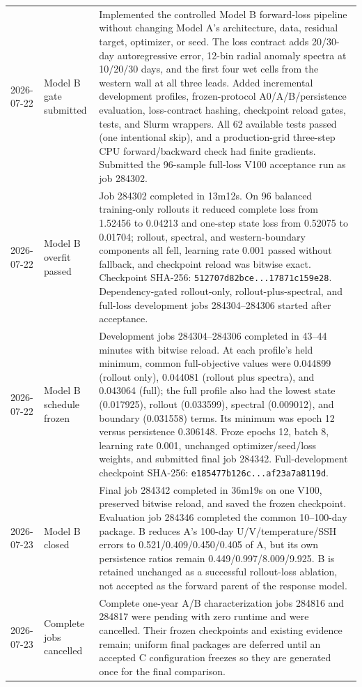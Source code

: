 \documentclass[11pt]{article}
\begin{document}
\begin{longtable}{@{}p{}p{}p{}@{}}
2026-07-22 & Model B gate submitted & Implemented the controlled Model B forward-loss pipeline without changing Model A's architecture, data, residual target, optimizer, or seed.  The loss contract adds 20/30-day autoregressive error, 12-bin radial anomaly spectra at 10/20/30 days, and the first four wet cells from the western wall at all three leads.  Added incremental development profiles, frozen-protocol A0/A/B/persistence evaluation, loss-contract hashing, checkpoint reload gates, tests, and Slurm wrappers.  All 62 available tests passed (one intentional skip), and a production-grid three-step CPU forward/backward check had finite gradients.  Submitted the 96-sample full-loss V100 acceptance run as job 284302. \\
2026-07-22 & Model B overfit passed & Job 284302 completed in 13m12s.  On 96 balanced training-only rollouts it reduced complete loss from 1.52456 to 0.04213 and one-step state loss from 0.52075 to 0.01704; rollout, spectral, and western-boundary components all fell, learning rate 0.001 passed without fallback, and checkpoint reload was bitwise exact.  Checkpoint SHA-256: \texttt{512707d82bce...17871c159e28}.  Dependency-gated rollout-only, rollout-plus-spectral, and full-loss development jobs 284304--284306 started after acceptance. \\
2026-07-22 & Model B schedule frozen & Development jobs 284304--284306 completed in 43--44 minutes with bitwise reload.  At each profile's held minimum, common full-objective values were 0.044899 (rollout only), 0.044081 (rollout plus spectra), and 0.043064 (full); the full profile also had the lowest state (0.017925), rollout (0.033599), spectral (0.009012), and boundary (0.031558) terms.  Its minimum was epoch 12 versus persistence 0.306148.  Froze epochs 12, batch 8, learning rate 0.001, unchanged optimizer/seed/loss weights, and submitted final job 284342.  Full-development checkpoint SHA-256: \texttt{e185477b126c...af23a7a8119d}. \\
2026-07-23 & Model B closed & Final job 284342 completed in 36m19s on one V100, preserved bitwise reload, and saved the frozen checkpoint.  Evaluation job 284346 completed the common 10--100-day package.  B reduces A's 100-day U/V/temperature/SSH errors to 0.521/0.409/0.450/0.405 of A, but its own persistence ratios remain 0.449/0.997/8.009/9.925.  B is retained unchanged as a successful rollout-loss ablation, not accepted as the forward parent of the response model. \\
2026-07-23 & Complete jobs cancelled & Complete one-year A/B characterization jobs 284816 and 284817 were pending with zero runtime and were cancelled.  Their frozen checkpoints and existing evidence remain; uniform final packages are deferred until an accepted C configuration freezes so they are generated once for the final comparison. \\

\end{longtable}
\end{document}
